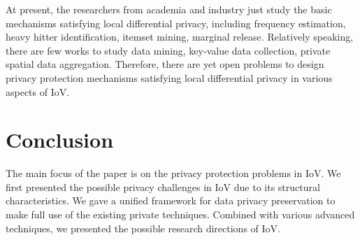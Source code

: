 \documentclass[journal,transmag,11pt]{IEEEtran}
\begin{document}
At present, the researchers from academia and industry just study the basic mechanisms satisfying local differential privacy, including frequency estimation, heavy hitter identification, itemset mining, marginal release. Relatively speaking, there are few works to study data mining, key-value data collection, private spatial data aggregation. Therefore, there are yet open problems to design privacy protection mechanisms satisfying local differential privacy in various aspects of IoV.



\section{Conclusion}

The main focus of the paper is on the privacy protection problems in IoV. We first presented the possible privacy challenges in IoV due to its structural characteristics. We gave a unified framework for data privacy preservation to make full use of the existing private techniques. Combined with various advanced techniques, we presented the possible research directions of IoV.

\end{document}
